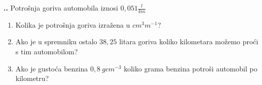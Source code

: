 
\noindent 
\textbf{
\thecjelina.\thezadatak.}
Potrošnja goriva automobila iznosi $0,051\frac{l}{km}$ 
\begin{enumerate}[label=\alph*)]
  \item Kolika je potrošnja goriva izražena u $cm^3 m^{-1}$?
  \item Ako je u spremniku ostalo $38,25$ litara goriva koliko kilometara možemo proći s tim automobilom?
  \item Ako je gustoća benzina $0,8\ g cm^{-3}$ koliko grama benzina potroši automobil po kilometru?
  
\end{enumerate}
